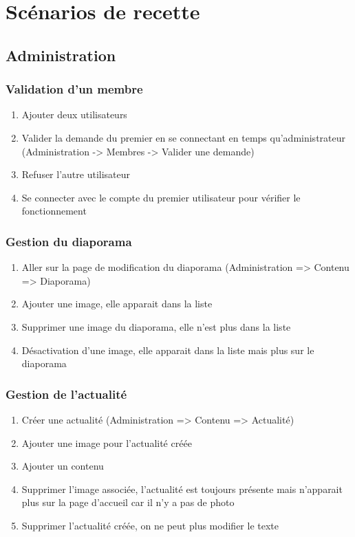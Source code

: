 \documentclass[11pt]{report}
\begin{document}
\section{Scénarios de recette}
\subsection{Administration}
\subsubsection{Validation d'un membre}
\begin{enumerate}
\item Ajouter deux utilisateurs
\item Valider la demande du premier en se connectant en temps qu'administrateur (Administration -> Membres -> Valider une demande)
\item Refuser l’autre utilisateur
\item Se connecter avec le compte du premier utilisateur pour vérifier le fonctionnement
\end{enumerate}
\subsubsection{Gestion du diaporama}
\begin{enumerate}
\item Aller sur la page de modification du diaporama (Administration => Contenu => Diaporama)
\item Ajouter une image, elle apparait dans la liste
\item Supprimer une image du diaporama, elle n'est plus dans la liste
\item Désactivation d’une image, elle apparait dans la liste mais plus sur le diaporama
\end{enumerate}
\subsubsection{Gestion de l'actualité}
\begin{enumerate}
\item Créer une actualité (Administration => Contenu => Actualité)
\item Ajouter une image pour l’actualité créée
\item Ajouter un contenu
\item Supprimer l’image associée, l'actualité est toujours présente mais n'apparait plus sur la page d'accueil car il n'y a pas de photo
\item Supprimer l’actualité créée, on ne peut plus modifier le texte
\end{enumerate}
\end{document}
